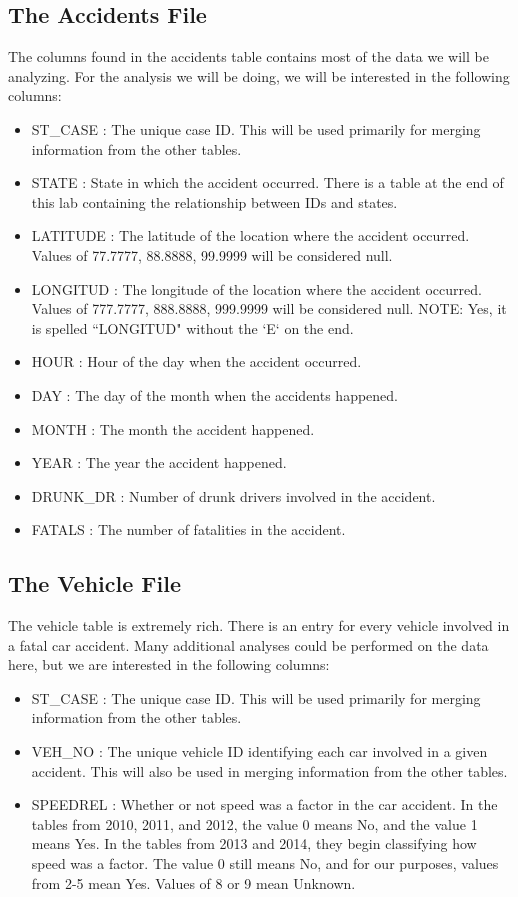 \subsection*{The Accidents File}
The columns found in the accidents table contains most of the data we will be
analyzing. For the analysis we will be doing, we will be interested in the
following columns:
\begin{itemize}
    \item ST\_CASE : The unique case ID. This will be used primarily for merging
        information from the other tables.
    \item STATE : State in which the accident occurred. There is a table at the
        end of this lab containing the relationship between IDs and states.
    \item LATITUDE : The latitude of the location where the accident occurred.
        Values of 77.7777, 88.8888, 99.9999 will be considered null.
    \item LONGITUD : The longitude of the location where the accident occurred.
        Values of 777.7777, 888.8888, 999.9999 will be considered null.
        NOTE: Yes, it is spelled ``LONGITUD" without the `E` on the end.

    \item HOUR : Hour of the day when the accident occurred.
    \item DAY : The day of the month when the accidents happened.
    \item MONTH : The month the accident happened.
    \item YEAR : The year the accident happened.
    \item DRUNK\_DR : Number of drunk drivers involved in the accident.
    \item FATALS : The number of fatalities in the accident.
\end{itemize}

\subsection*{The Vehicle File}
The vehicle table is extremely rich. There is an entry for every vehicle involved
in a fatal car accident. Many additional analyses could be performed
on the data here, but we are interested in the following columns:
\begin{itemize}
    \item ST\_CASE : The unique case ID. This will be used primarily for merging
        information from the other tables.
    \item VEH\_NO : The unique vehicle ID identifying each car involved in a given
        accident. This will also be used in merging information from the other
        tables.
    \item SPEEDREL : Whether or not speed was a factor in the car accident. In
        the tables from 2010, 2011, and 2012, the value 0 means No, and the
        value 1 means Yes. In the tables from 2013 and 2014, they begin classifying
        how speed was a factor. The value 0 still means No, and for our purposes,
        values from 2-5 mean Yes. Values of 8 or 9 mean Unknown.
\end{itemize}

